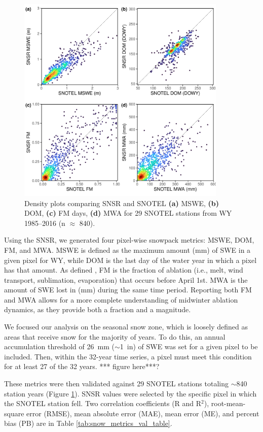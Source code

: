 \begin{figure}[t]
\centering
\includegraphics[width=10cm]{figures/ch2_figs/snsr_snotel_metric_compare_new_v1.pdf}
\caption{Density plots comparing SNSR and SNOTEL \textbf{(a)} MSWE, \textbf{(b)} DOM, \textbf{(c)} FM days, \textbf{(d)} MWA for 29 SNOTEL stations from WY 1985--2016 (n $\approx$ 840).}
\label{kuy_study_area}
\end{figure}

Using the SNSR, we generated four pixel-wise snowpack metrics: MSWE, DOM, FM, and MWA. MSWE is defined as the maximum amount (mm) of SWE in a given pixel for WY, while DOM is the last day of the water year in which a pixel has that amount. As defined \cite{musselmanWinterMeltTrends2021}, FM is the fraction of ablation (i.e., melt, wind transport, sublimation, evaporation) that occurs before April 1st. MWA is the amount of SWE lost in (mm) during the same time period. Reporting both FM and MWA allows for a more complete understanding of midwinter ablation dynamics, as they provide both a fraction and a magnitude.

We focused our analysis on the seasonal snow zone, which is loosely defined as areas that receive snow for the majority of years. To do this, an annual accumulation threshold of 26~mm ($\sim$1~in) of SWE was set for a given pixel to be included. Then, within the 32-year time series, a pixel must meet this condition for at least 27 of the 32 years. *** figure here***?

These metrics were then validated against 29 SNOTEL stations totaling $\sim$840 station years (Figure \ref{kuy_study_area}). SNSR values were selected by the specific pixel in which the SNOTEL station fell. Two correlation coefficients (R and R$^{2}$), root-mean-square error (RMSE), mean absolute error (MAE), mean error (ME), and percent bias (PB) are in Table \ref{tab:snow_metrics_val_table}.


